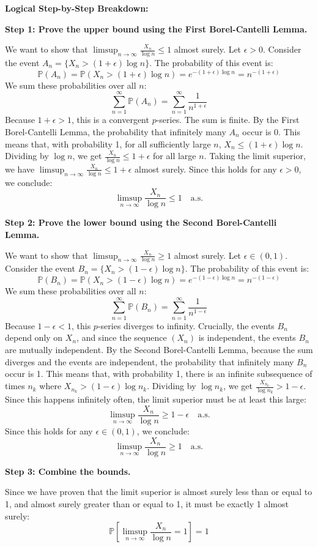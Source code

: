 \begin{solution}
\textbf{Logical Step-by-Step Breakdown:}

\textbf{Step 1: Prove the upper bound using the First Borel-Cantelli Lemma.}

We want to show that $\limsup_{n \to \infty} \frac{X_n}{\log n} \leq 1$ almost surely.
Let $\epsilon > 0$. Consider the event $A_n = \{ X_n > (1+\epsilon)\log n \}$.
The probability of this event is:
\[ \mathbb{P}(A_n) = \mathbb{P}(X_n > (1+\epsilon)\log n) = e^{-(1+\epsilon)\log n} = n^{-(1+\epsilon)} \]
We sum these probabilities over all $n$:
\[ \sum_{n=1}^\infty \mathbb{P}(A_n) = \sum_{n=1}^\infty \frac{1}{n^{1+\epsilon}} \]
Because $1+\epsilon > 1$, this is a convergent $p$-series. The sum is finite.
By the First Borel-Cantelli Lemma, the probability that infinitely many $A_n$ occur is 0.
This means that, with probability 1, for all sufficiently large $n$, $X_n \leq (1+\epsilon)\log n$.
Dividing by $\log n$, we get $\frac{X_n}{\log n} \leq 1+\epsilon$ for all large $n$.
Taking the limit superior, we have $\limsup_{n \to \infty} \frac{X_n}{\log n} \leq 1+\epsilon$ almost surely. Since this holds for any $\epsilon > 0$, we conclude:
\[ \limsup_{n \to \infty} \frac{X_n}{\log n} \leq 1 \quad \text{a.s.} \]

\textbf{Step 2: Prove the lower bound using the Second Borel-Cantelli Lemma.}

We want to show that $\limsup_{n \to \infty} \frac{X_n}{\log n} \geq 1$ almost surely.
Let $\epsilon \in (0, 1)$. Consider the event $B_n = \{ X_n > (1-\epsilon)\log n \}$.
The probability of this event is:
\[ \mathbb{P}(B_n) = \mathbb{P}(X_n > (1-\epsilon)\log n) = e^{-(1-\epsilon)\log n} = n^{-(1-\epsilon)} \]
We sum these probabilities over all $n$:
\[ \sum_{n=1}^\infty \mathbb{P}(B_n) = \sum_{n=1}^\infty \frac{1}{n^{1-\epsilon}} \]
Because $1-\epsilon < 1$, this $p$-series diverges to infinity.
Crucially, the events $B_n$ depend only on $X_n$, and since the sequence $(X_n)$ is independent, the events $B_n$ are mutually independent.
By the Second Borel-Cantelli Lemma, because the sum diverges and the events are independent, the probability that infinitely many $B_n$ occur is 1.
This means that, with probability 1, there is an infinite subsequence of times $n_k$ where $X_{n_k} > (1-\epsilon)\log n_k$.
Dividing by $\log n_k$, we get $\frac{X_{n_k}}{\log n_k} > 1-\epsilon$.
Since this happens infinitely often, the limit superior must be at least this large:
\[ \limsup_{n \to \infty} \frac{X_n}{\log n} \geq 1-\epsilon \quad \text{a.s.} \]
Since this holds for any $\epsilon \in (0, 1)$, we conclude:
\[ \limsup_{n \to \infty} \frac{X_n}{\log n} \geq 1 \quad \text{a.s.} \]

\textbf{Step 3: Combine the bounds.}

Since we have proven that the limit superior is almost surely less than or equal to 1, and almost surely greater than or equal to 1, it must be exactly 1 almost surely:
\[ \mathbb{P}\left[ \limsup_{n \to \infty} \frac{X_n}{\log n} = 1 \right] = 1 \]
\end{solution}

